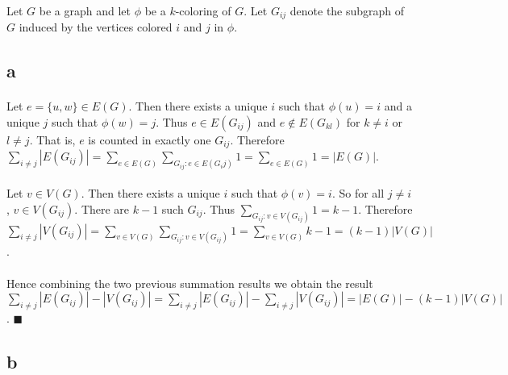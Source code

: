 \documentclass[letterpaper,12pt,oneside,onecolumn]{report}
\begin{document}
\paragraph{}
Let $G$ be a graph and let $\phi$ be a $k$-coloring of $G$. Let $G_{ij}$ denote the subgraph of $G$ induced by the vertices colored $i$ and $j$ in $\phi$.
\subsection*{a}
\paragraph{}
Let $e = \{u,w\} \in E(G)$. Then there exists a unique $i$ such that $\phi(u) = i$ and a unique $j$ such that $\phi(w) = j$. Thus $e \in E(G_{ij})$ and $e \not\in E(G_{kl})$ for $k \neq i$ or $l \neq j$. That is, $e$ is counted in exactly one $G_{ij}$. Therefore $\sum_{i \neq j} |E(G_{ij})| = \sum_{e \in E(G)} \sum_{G_{ij}: e \in E(G_ij)} 1 = \sum_{e \in E(G)} 1 = |E(G)|$.
\paragraph{}
Let $v \in V(G)$. Then there exists a unique $i$ such that $\phi(v) = i$. So for all $j\neq i$, $v \in V(G_{ij})$. There are $k-1$ such $G_{ij}$. Thus $\sum_{G_{ij}: v \in V(G_{ij})} 1 = k-1$. Therefore $\sum_{i\neq j} |V(G_{ij})| = \sum_{v \in V(G)} \sum_{G_{ij} : v \in V(G_{ij})} 1 = \sum_{v \in V(G)} k-1 = (k-1)|V(G)|$.
\paragraph{}
Hence combining the two previous summation results we obtain the result $\sum_{i\neq j}|E(G_{ij})| - |V(G_{ij})| = \sum_{i\neq j} |E(G_{ij})| - \sum_{i\neq j} |V(G_{ij})| = |E(G)| - (k-1)|V(G)|$. $\blacksquare$
\subsection*{b}
\paragraph{}
\end{document}
